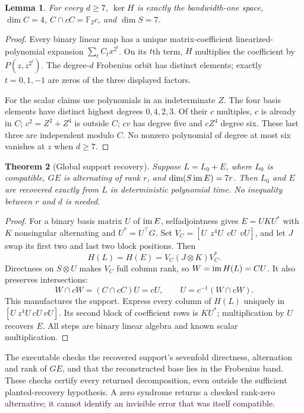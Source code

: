 \documentclass[11pt]{article}
\newtheorem{theorem}{Theorem}[section]\newtheorem{lemma}[theorem]{Lemma}
\theoremstyle{remark}\newtheorem{remark}[theorem]{Remark}
\newcommand{\F}{\mathbb F}\newcommand{\Tr}{\operatorname{Tr}}
\begin{document}
\begin{lemma}
For every $d\ge7$, $\ker H$ is exactly the bandwidth-one space,
$\dim C=4$, $C\cap cC=\F_2c$, and $\dim S=7$.
\end{lemma}
\begin{proof}
Every binary linear map has a unique matrix-coefficient linearized-polynomial
expansion $\sum_t C_t x^{2^t}$. On its $t$th term, $H$ multiplies the
coefficient by $P(z,z^{2^t})$. The degree-$d$ Frobenius orbit has distinct
elements; exactly $t=0,1,-1$ are zeros of the three displayed factors.

For the scalar claims use polynomials in an indeterminate $Z$. The four
basis elements have distinct highest degrees $0,4,2,3$. Of their $c$
multiples, $c$ is already in $C$; $c^2=Z^2+Z^4$ is outside $C$;
$cv$ has degree five and $cZ^4$ degree six. These last three are
independent modulo $C$. No nonzero polynomial of degree at most six
vanishes at $z$ when $d\ge7$.
\end{proof}

\begin{theorem}[Global support recovery]
Suppose $L=L_0+E$, where $L_0$ is compatible, $GE$ is alternating of rank
$r$, and $\dim(S\operatorname{im} E)=7r$. Then $L_0$ and $E$ are recovered exactly from
$L$ in deterministic polynomial time. No inequality between $r$ and $d$
is needed.
\end{theorem}
\begin{proof}
For a binary basis matrix $U$ of $\operatorname{im} E$, selfadjointness gives
$E=UKU^*$ with $K$ nonsingular alternating and $U^*=U^\top G$.
Set $V_C=[U\ \ z^4U\ \ cU\ \ vU]$, and let $J$ swap its first two
and last two block positions. Then
\[
 H(L)=H(E)=V_C(J\otimes K)V_C^*.
\]
Directness on $S\otimes U$ makes $V_C$ full column rank, so
$W=\operatorname{im} H(L)=CU$. It also preserves intersections:
\[
 W\cap cW=(C\cap cC)U=cU,\qquad
 U=c^{-1}(W\cap cW).
\]
This manufactures the support. Express every column of $H(L)$ uniquely
in $[U\ z^4U\ cU\ vU]$. Its second block of coefficient rows is
$KU^*$; multiplication by $U$ recovers $E$. All steps are binary
linear algebra and known scalar multiplication.
\end{proof}

The executable checks the recovered support's sevenfold directness,
alternation and rank of $GE$, and that the reconstructed base lies in the
Frobenius band. These checks certify every returned decomposition, even
outside the sufficient planted-recovery hypothesis. A zero syndrome returns
a checked rank-zero alternative; it cannot identify an invisible error
that was itself compatible.
\end{document}
